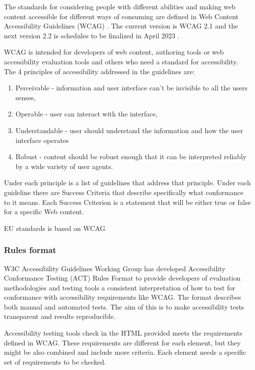 \documentclass{master_thesis}
\begin{document}
The standards for considering people with different abilities and making web content accessible for different ways of consuming are defined in Web Content Accessibility Guidelines (WCAG) \citep{Kirkpatrick2018}. The current version is WCAG 2.1 and the next version 2.2 is schedules to be finalized in April 2023 \citep{Henry2023}.

WCAG is intended for developers of web content, authoring tools or web accessibility evaluation tools and others who need a standard for accessibility. The 4 principles of accessibility addressed in the guidelines are:
\begin{enumerate}
	\item Perceivable - information and user interface can't be invisible to all the users senses,
	\item Operable - user can interact with the interface,
	\item Understandable - user should understand the information and how the user interface operates
	\item Robust - content should be robust enough that it can be interpreted reliably by a wide variety of user agents.
\end{enumerate}
Under each principle is a list of guidelines that address that principle. Under each guideline there are Success Criteria that describe specifically what conformance to it means. Each Success Criterion is a statement that will be either true or false for a specific Web content.

\citep{AGWGWP2022} 

EU standards is based on WCAG \citep{Mueller2017}

\subsubsection{Rules format}

W3C Accessibility Guidelines Working Group has developed Accessibility Conformance Testing (ACT) Rules Format to provide developers of evaluation methodologies and testing tools a consistent interpretation of how to test for conformance with accessibility requirements like WCAG. The format describes both manual and automated tests. The aim of this is to make accessibility tests transparent and results reproducible. \citep{Fiers2019}

Accessibility testing tools check in the HTML provided meets the requirements defined in WCAG. These requirements are different for each element, but they might be also combined and include more criteria. Each element needs a specific set of requirements to be checked.
\end{document}
